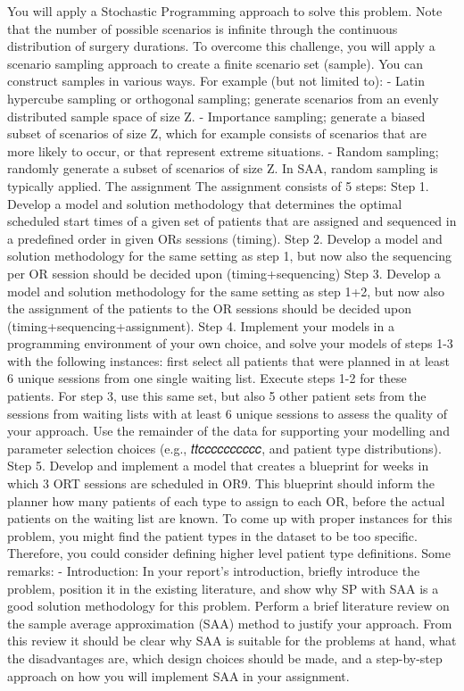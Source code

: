 You will apply a Stochastic Programming approach to solve this problem. Note that the number of possible scenarios is infinite through the continuous distribution of surgery durations. To overcome this challenge, you will apply a scenario sampling approach to create a finite scenario set (sample). You can construct samples in various ways. For example (but not limited to):
- Latin hypercube sampling or orthogonal sampling; generate scenarios from an evenly distributed sample space of size Z.
- Importance sampling; generate a biased subset of scenarios of size Z, which for example consists of scenarios that are more likely to occur, or that represent extreme situations.
- Random sampling; randomly generate a subset of scenarios of size Z. In SAA, random sampling is typically applied.
The assignment
The assignment consists of 5 steps:
Step 1. Develop a model and solution methodology that determines the optimal scheduled start times of a given set of patients that are assigned and sequenced in a predefined order in given ORs sessions (timing).
Step 2. Develop a model and solution methodology for the same setting as step 1, but now also the sequencing per OR session should be decided upon (timing+sequencing)
Step 3. Develop a model and solution methodology for the same setting as step 1+2, but now also the assignment of the patients to the OR sessions should be decided upon (timing+sequencing+assignment).
Step 4. Implement your models in a programming environment of your own choice, and solve your models of steps 1-3 with the following instances: first select all patients that were planned in at least 6 unique sessions from one single waiting list. Execute steps 1-2 for these patients. For step 3, use this same set, but also 5 other patient sets from the sessions from waiting lists with at least 6 unique sessions to assess the quality of your approach. Use the remainder of
the data for supporting your modelling and parameter selection choices (e.g., 𝑡𝑡𝑐𝑐𝑐𝑐𝑐𝑐𝑐𝑐𝑐𝑐, and patient type distributions). Step 5. Develop and implement a model that creates a blueprint for weeks in which 3 ORT sessions are scheduled in OR9. This blueprint should inform the planner how many patients of each type to assign to each OR, before the actual patients on the waiting list are known. To come up with proper instances for this problem, you might find the patient types in the dataset to be too specific. Therefore, you could consider defining higher level patient type definitions.
Some remarks:
- Introduction: In your report’s introduction, briefly introduce the problem, position it in the existing literature, and show why SP with SAA is a good solution methodology for this problem. Perform a brief literature review on the sample average approximation (SAA) method to justify your approach. From this review it should be clear why SAA is suitable for the problems at hand, what the disadvantages are, which design choices should be made, and a step-by-step approach on how you will implement SAA in your assignment.
